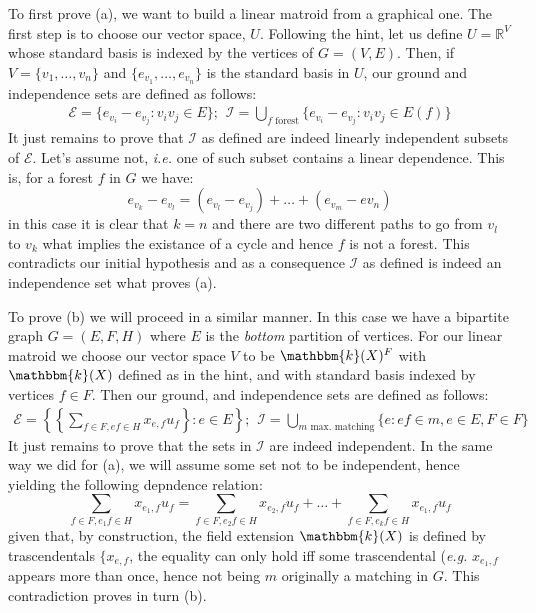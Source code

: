 To first prove (a), we want to build a linear matroid from a graphical one.
The first step is to choose our vector space, $U$.
Following the hint, let us define $U = \mathbb{R}^V$ whose standard basis is indexed by the vertices of $G = (V, E)$.
Then, if $V = \lbrace v_1, \dots, v_n \rbrace$ and $\lbrace e_{v_1}, \dots, e_{v_n}\rbrace$ is the standard basis in $U$, our ground and independence sets are defined as follows:
\begin{equation*}
    \begin{split}
        \mathcal{E} = \lbrace e_{v_i} - e_{v_j} : v_iv_j \in E \rbrace ;
        \hspace{5pt} \mathcal{I} = \bigcup_{f \text{ forest}} \lbrace e_{v_i} - e_{v_j} : v_iv_j \in E(f) \rbrace
    \end{split}
\end{equation*}
It just remains to prove that $\mathcal{I}$ as defined are indeed linearly independent subsets of $\mathcal{E}$.
Let's assume not, \textit{i.e.} one of such subset contains a linear dependence.
This is, for a forest $f$ in $G$ we have:
\begin{equation*}
    e_{v_k} - e_{v_l} = (e_{v_l} - e_{v_j}) + \dots + (e_{v_m} - e{v_n})
\end{equation*}
in this case it is clear that $k = n$ and there are two different paths to go from $v_l$ to $v_k$ what implies the existance of a cycle and hence $f$ is not a forest.
This contradicts our initial hypothesis and as a consequence $\mathcal{I}$ as defined is indeed an independence set what proves (a).

To prove (b) we will proceed in a similar manner.
In this case we have a bipartite graph $G = (E, F, H)$ where $E$ is the \textit{bottom} partition of vertices.
For our linear matroid we choose our vector space $V$ to be $\mathbbm{k}(X)^F$ with $\mathbbm{k}(X)$ defined as in the hint, and with standard basis indexed by vertices $f \in F$.
Then our ground, and independence sets are defined as follows:
\begin{equation*}
    \begin{split}
        \mathcal{E} = \left\lbrace \left\lbrace \sum_{f \in F, ef \in H} x_{e,f} u_f \right\rbrace : e \in E \right\rbrace ;
        \hspace{5pt} \mathcal{I} = \bigcup_{\text{$m$ max. matching}} \lbrace e : ef \in m, e \in E, F \in F \rbrace
    \end{split}
\end{equation*}
It just remains to prove that the sets in $\mathcal{I}$ are indeed independent.
In the same way we did for (a), we will assume some set not to be independent, hence yielding the following depndence relation:
\begin{equation*}
    \sum_{f \in F, e_1f \in H} x_{e_1,f} u_f = \sum_{f \in F, e_2f \in H} x_{e_2,f} u_f  + \dots + \sum_{f \in F, e_kf \in H} x_{e_1,f} u_f 
\end{equation*}
given that, by construction, the field extension $\mathbbm{k}(X)$ is defined by trascendentals $\lbrace x_{e,f}$, the equality can only hold iff some trascendental (\textit{e.g.} $x_{e_1,f}$ appears more than once, hence not being $m$ originally a matching in $G$.
This contradiction proves in turn (b).
